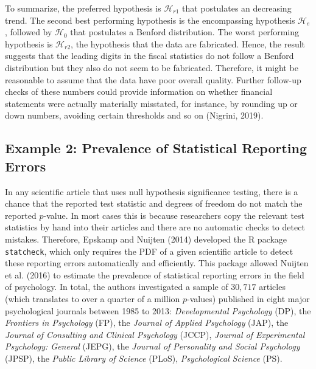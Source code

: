 \documentclass[
  english,
  man,floatsintext]{apa6}
\begin{document}
To summarize, the preferred hypothesis is \(\mathcal{H}_{r1}\) that postulates an decreasing trend. The second best performing hypothesis is the encompassing hypothesis \(\mathcal{H}_{e}\), followed by \(\mathcal{H}_{0}\) that postulates a Benford distribution. The worst performing hypothesis is \(\mathcal{H}_{r2}\), the hypothesis that the data are fabricated. Hence, the result suggests that the leading digits in the fiscal statistics do not follow a Benford distribution but they also do not seem to be fabricated. Therefore, it might be reasonable to assume that the data have poor overall quality. Further follow-up checks of these numbers could provide information on whether financial statements were actually materially misstated, for instance, by rounding up or down numbers, avoiding certain thresholds and so on (Nigrini, 2019).

\hypertarget{example-2-prevalence-of-statistical-reporting-errors}{%
\subsection{Example 2: Prevalence of Statistical Reporting Errors}\label{example-2-prevalence-of-statistical-reporting-errors}}

In any scientific article that uses null hypothesis significance testing, there is a chance that the reported test statistic and degrees of freedom do not match the reported \(p\)-value. In most cases this is because researchers copy the relevant test statistics by hand into their articles and there are no automatic checks to detect mistakes. Therefore, Epskamp and Nuijten (2014) developed the R package \texttt{statcheck}, which only requires the PDF of a given scientific article to detect these reporting errors automatically and efficiently. This package allowed Nuijten et al. (2016) to estimate the prevalence of statistical reporting errors in the field of psychology. In total, the authors investigated a sample of \(30{,}717\) articles (which translates to over a quarter of a million \(p\)-values) published in eight major psychological journals between 1985 to 2013: \emph{Developmental Psychology} (DP), the \emph{Frontiers in Psychology} (FP), the \emph{Journal of Applied Psychology} (JAP), the \emph{Journal of Consulting and Clinical Psychology} (JCCP), \emph{Journal of Experimental Psychology: General} (JEPG), the \emph{Journal of Personality and Social Psychology} (JPSP), the \emph{Public Library of Science} (PLoS), \emph{Psychological Science} (PS).
\end{document}
